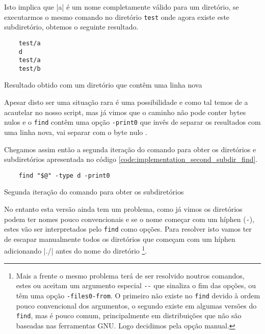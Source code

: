 Isto implica que \bashinline|a\nd| é um nome completamente válido para um diretório,
se executarmos o mesmo comando no diretório \Verb|test| onde agora existe este
subdiretório, obtemos o seguinte resultado.

\begin{listing}[H]
	\centering
	\begin{verbatim}
    test/a
    d
    test/a
    test/b
  \end{verbatim}
	\caption{Resultado obtido com um diretório que contêm uma linha nova}
\end{listing}

Apesar disto ser uma situação rara é uma possibilidade e como tal temos de a
acautelar no nosso script, mas já vimos que o caminho não pode conter bytes
nulos e o \Verb|find| contêm uma opção \Verb|-print0| que invês de separar os
resultados com uma linha nova, vai separar com o byte nulo \cite{find_man}.

Chegamos assim então a segunda iteração do comando para obter os diretórios e
subdiretórios apresentada no código \ref{code:implementation_second_subdir_find}.

\begin{listing}[H]
	\centering
	\begin{verbatim}
    find "$@" -type d -print0
  \end{verbatim}
	\caption{Segunda iteração do comando para obter os subdiretórios}
	\label{code:implementation_second_subdir_find}
\end{listing}

No entanto esta versão ainda tem um problema, como já vimos os diretórios podem
ter nomes pouco convencionais e se o nome começar com um híphen (\Verb|-|),
estes vão ser interpretados pelo \Verb|find| como opções. Para resolver isto
vamos ter de escapar manualmente todos os diretórios que começam com um híphen
adicionando \bashinline|./| antes do nome do diretório
\footnote{Mais a frente o mesmo problema terá de ser resolvido noutros comandos,
	estes ou aceitam um argumento especial \Verb|--| que sinaliza o fim das opções,
	ou têm uma opção \Verb|-files0-from|. O primeiro não existe no \Verb|find|
	devido à ordem pouco convencional dos argumentos, o segundo existe em algumas
	versões do \Verb|find|, mas é pouco comum, principalmente em distribuições que
	não são baseadas nas ferramentas GNU. Logo decidimos pela opção manual.}.

